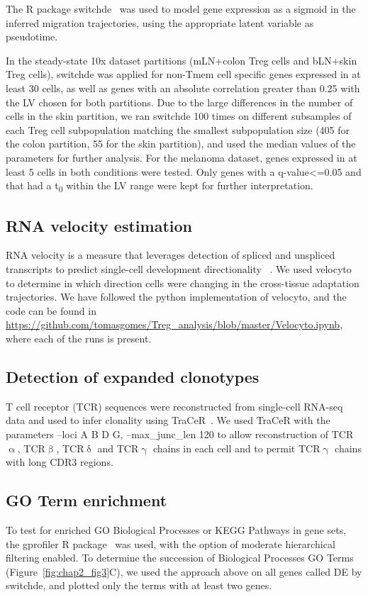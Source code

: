 The R package switchde~\citep{Campbell2017-cf} was used to model gene expression as a sigmoid in the inferred migration trajectories, using the appropriate latent variable as pseudotime. 

In the steady-state 10x dataset partitions (mLN+colon Treg cells and bLN+skin Treg cells), switchde was applied for non-Tmem cell specific genes expressed in at least 30 cells, as well as genes with an absolute correlation greater than 0.25 with the LV chosen for both partitions. Due to the large differences in the number of cells in the skin partition, we ran switchde 100 times on different subsamples of each Treg cell subpopulation matching the smallest subpopulation size (405 for the colon partition, 55 for the skin partition), and used the median values of the parameters for further analysis. For the melanoma dataset, genes expressed in at least 5 cells in both conditions were tested. Only genes with a q-value<=0.05 and that had a t\textsubscript{0} within the LV range were kept for further interpretation.

\subsection{RNA velocity estimation}
RNA velocity is a measure that leverages detection of spliced and unspliced transcripts to predict single-cell development directionality ~\citep{manno_rna_2018}. We used velocyto to determine in which direction cells were changing in the cross-tissue adaptation trajectories. We have followed the python implementation of velocyto, and the code can be found in \url{https://github.com/tomasgomes/Treg\_analysis/blob/master/Velocyto.ipynb}, where each of the runs is present.

\subsection{Detection of expanded clonotypes}
T cell receptor (TCR) sequences were reconstructed from single-cell RNA-seq data and used to infer clonality using TraCeR~\citep{stubbington_t_2016}. We used TraCeR with the parameters --loci A B D G, --max\_junc\_len 120 to allow reconstruction of TCR${\upalpha}$, TCR${\upbeta}$, TCR${\updelta}$ and TCR${\upgamma}$ chains in each cell and to permit TCR${\upgamma}$ chains with long CDR3 regions. 

\subsection{GO Term enrichment}
To test for enriched GO Biological Processes or KEGG Pathways in gene sets, the gprofiler R package~\citep{Reimand2016-fj} was used, with the option of moderate hierarchical filtering enabled.
To determine the succession of Biological Processes GO Terms (Figure~\ref{fig:chap2_fig3}C), we used the approach above on all genes called DE by switchde, and plotted only the terms with at least two genes.

